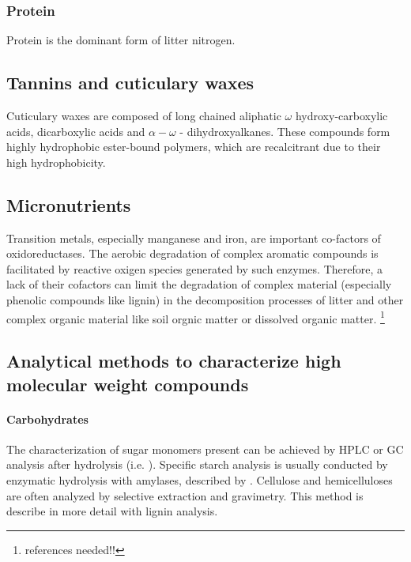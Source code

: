 

\subsubsection{Protein}

Protein is the dominant form of litter nitrogen. 

\subsection{Tannins and cuticulary waxes}
Cuticulary waxes are composed of long chained aliphatic $\omega$ hydroxy-carboxylic acids, dicarboxylic acids and  $\alpha -\omega$ -  dihydroxyalkanes. These compounds form highly hydrophobic ester-bound polymers, which are recalcitrant due to their high hydrophobicity. 




\subsection{Micronutrients}

Transition metals, especially manganese and iron, are important co-factors of oxidoreductases. The aerobic degradation of complex aromatic compounds is facilitated by reactive oxigen species generated by such enzymes. Therefore, a lack of their cofactors can limit the degradation of complex material (especially phenolic compounds like lignin) in the decomposition processes of litter and other complex organic material like soil orgnic matter or dissolved organic matter. \footnote{references needed!!}



\subsection{Analytical methods to characterize high molecular weight compounds}

\paragraph{Carbohydrates}
The characterization of sugar monomers present can be achieved by HPLC or GC analysis after hydrolysis (i.e. \cite{Snajdr2011}). Specific starch analysis is usually conducted by enzymatic hydrolysis with amylases, described by \cite{Leitner2011}. Cellulose and hemicelluloses are  often analyzed by selective extraction and gravimetry. This method is describe in more detail with lignin analysis.

